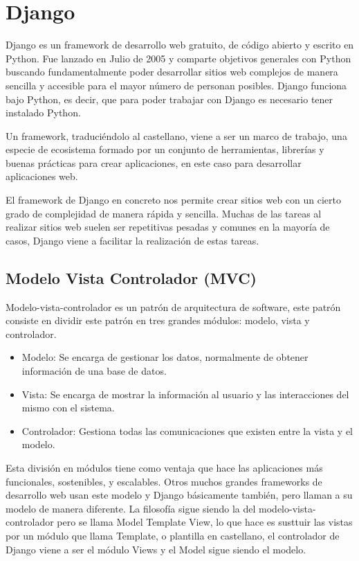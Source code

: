 \documentclass[a4paper, 12pt]{book}
\begin{document}
  
\section{Django}
Django es un framework de desarrollo web gratuito, de código abierto y escrito en Python. Fue lanzado en Julio de 2005 y comparte objetivos generales con Python buscando fundamentalmente poder desarrollar sitios web complejos de manera sencilla y accesible para el mayor número de personan posibles. Django funciona bajo Python, es decir, que para poder trabajar con Django es necesario tener instalado Python. 

Un framework, traduciéndolo al castellano, viene a ser un marco de trabajo, una especie de ecosistema formado por un  conjunto de herramientas, librerías y buenas prácticas para crear aplicaciones, en este caso para desarrollar aplicaciones web. 

El framework de Django en concreto nos permite crear sitios web con un cierto grado de complejidad de manera rápida y sencilla. Muchas de las tareas al realizar sitios web suelen ser repetitivas pesadas y comunes en la mayoría de casos, Django viene a facilitar la realización de estas tareas. 

\subsection{Modelo Vista Controlador (MVC)}
Modelo-vista-controlador es un patrón de arquitectura de software, este patrón consiste en dividir este patrón en tres grandes módulos: modelo, vista y controlador. 

\begin{itemize}
 \item Modelo: Se encarga de gestionar los datos, normalmente de obtener información de una base de datos. 
 \item Vista: Se encarga de mostrar la información al usuario y las interacciones del mismo con el sistema. 
 \item Controlador: Gestiona todas las comunicaciones que existen entre la vista y el modelo. 
\end{itemize}

Esta división en módulos tiene como ventaja que hace las aplicaciones más funcionales, sostenibles, y escalables. Otros muchos grandes frameworks de desarrollo web usan este modelo y Django básicamente también, pero llaman a su modelo de manera diferente. La filosofía sigue siendo la del modelo-vista-controlador pero se llama Model Template View, lo que hace es susttuir las vistas por un módulo que llama Template, o plantilla en castellano, el controlador de Django viene a ser el módulo Views y el Model sigue siendo el modelo.
\end{document}
